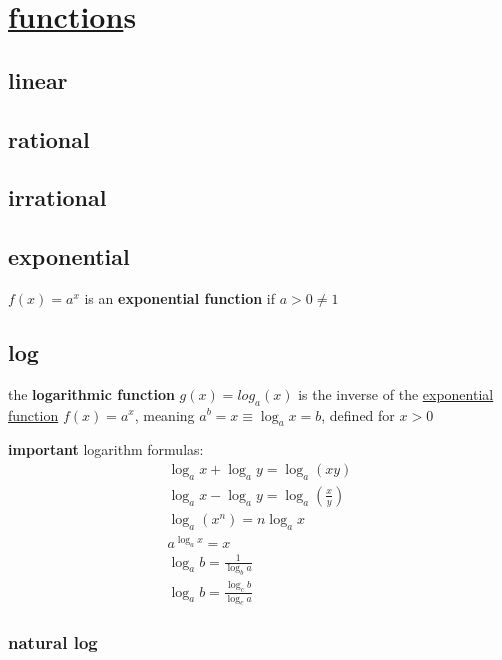 \documentclass[a4paper,12pt]{article}
\newcommand{\?}{\stackrel{?}{=}}
\begin{document}
\section{\href{discrete_maths2.org}{function}s}
\label{sec:org19a339d}
\subsection{linear}
\label{sec:org9ff23ea}
\subsection{rational}
\label{sec:org1945d51}
\subsection{irrational}
\label{sec:org665262b}
\subsection{exponential}
\label{sec:org151780b}
\begin{definition}
\(f(x)=a^x\) is an \textbf{exponential function} if \(a > 0 \neq 1\)\\[0pt]
\end{definition}
\subsection{log}
\label{sec:org56e717b}
\begin{definition}
the \textbf{logarithmic function} \(g(x) = log_a(x)\) is the inverse of the \hyperref[sec:org151780b]{exponential function} \(f(x) = a^x\), meaning \(a^b = x \equiv \log_ax=b\), defined for \(x > 0\)\\[0pt]
\begin{characteristic}
\textbf{important} logarithm formulas:\\[0pt]
\begin{gather}
  \log_ax + \log_ay = \log_a(xy)\\
  \log_ax - \log_ay = \log_a\left(\frac{x}{y}\right)\\
  \log_a(x^n) = n\log_ax\\
  a^{\log_ax} = x\\
  \log_a b = \frac{1}{\log_b a}\\
  \log_a b = \frac{\log_c b}{\log_c a}
\end{gather}
\end{characteristic}
\end{definition}
\subsubsection{natural log}
\label{sec:org69682cf}
\end{document}
